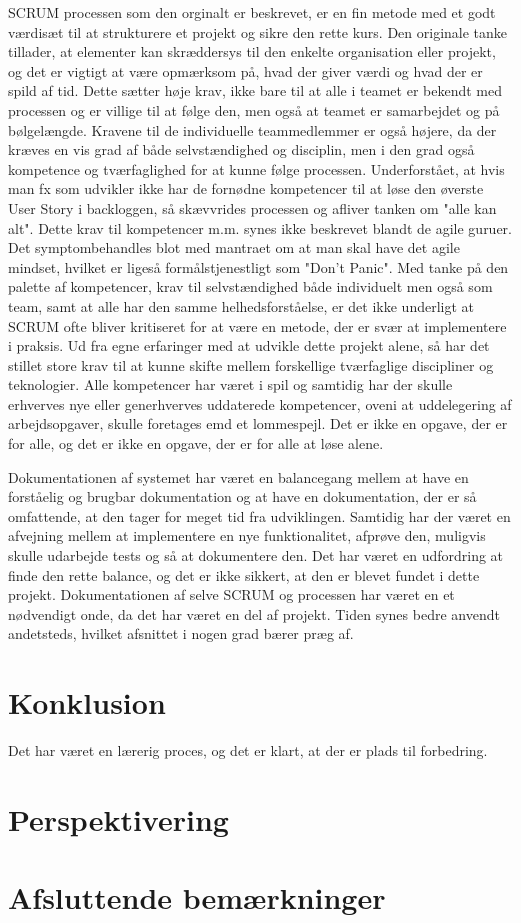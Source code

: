 SCRUM processen som den orginalt er beskrevet, er en fin metode med et godt værdisæt til at strukturere et projekt og sikre den rette kurs.
Den originale tanke tillader, at elementer kan skræddersys til den enkelte organisation eller projekt, og det er vigtigt at være opmærksom på, hvad der giver værdi og hvad der er spild af tid.
Dette sætter høje krav, ikke bare til at alle i teamet er bekendt med processen og er villige til at følge den, men også at teamet er samarbejdet og på bølgelængde.
Kravene til de individuelle teammedlemmer er også højere, da der kræves en vis grad af både selvstændighed og disciplin, men i den grad også kompetence og tværfaglighed for at kunne følge processen.
Underforstået, at hvis man fx som udvikler ikke har de fornødne kompetencer til at løse den øverste User Story i backloggen, så skævvrides processen og afliver tanken om "alle kan alt". 
Dette krav til kompetencer m.m. synes ikke beskrevet blandt de agile guruer. Det symptombehandles blot med mantraet om at man skal have det agile mindset, hvilket er ligeså formålstjenestligt som "Don't Panic".
Med tanke på den palette af kompetencer, krav til selvstændighed både individuelt men også som team, samt at alle har den samme helhedsforståelse, er det ikke underligt at SCRUM ofte bliver kritiseret for at være en metode, der er svær at implementere i praksis.
Ud fra egne erfaringer med at udvikle dette projekt alene, så har det stillet store krav til at kunne skifte mellem forskellige tværfaglige discipliner og teknologier. 
Alle kompetencer har været i spil og samtidig har der skulle erhverves nye eller generhverves uddaterede kompetencer, oveni at uddelegering af arbejdsopgaver, skulle foretages emd et lommespejl.
Det er ikke en opgave, der er for alle, og det er ikke en opgave, der er for alle at løse alene.

Dokumentationen af systemet har været en balancegang mellem at have en forståelig og brugbar dokumentation og at have en dokumentation, der er så omfattende, at den tager for meget tid fra udviklingen.
Samtidig har der været en afvejning mellem at implementere en nye funktionalitet, afprøve den, muligvis skulle udarbejde tests og så at dokumentere den.
Det har været en udfordring at finde den rette balance, og det er ikke sikkert, at den er blevet fundet i dette projekt. 
Dokumentationen af selve SCRUM og processen har været en et nødvendigt onde, da det har været en del af projekt. Tiden synes bedre anvendt andetsteds, hvilket afsnittet i nogen grad bærer præg af.

\section{Konklusion}
\label{sec:conclusion_conclusion}
Det har været en lærerig proces, og det er klart, at der er plads til forbedring.

\section{Perspektivering}
\label{sec:conclusion_perspective}

\section{Afsluttende bemærkninger}
\label{sec:conclusion_remarks}

